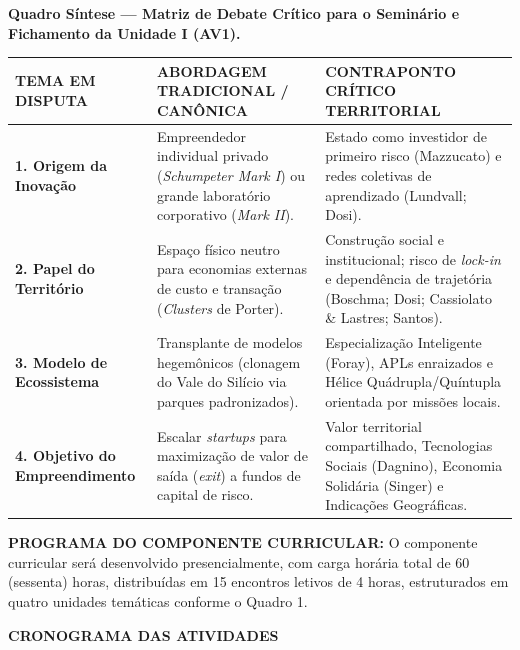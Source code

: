 \documentclass[11pt,a4paper]{article}
\begin{document}
\vspace{4pt}
\noindent\textbf{Quadro Síntese — Matriz de Debate Crítico para o Seminário e Fichamento da Unidade I (AV1).}\\[4pt]
\small
\noindent
\begin{tabularx}{\textwidth}{|p{2.9cm}|X|X|}
\hline
\rowcolor{uefslight}
\textbf{TEMA EM DISPUTA} & \textbf{ABORDAGEM TRADICIONAL / CANÔNICA} & \textbf{CONTRAPONTO CRÍTICO TERRITORIAL} \\
\hline
\textbf{1. Origem da Inovação} & Empreendedor individual privado (\textit{Schumpeter Mark I}) ou grande laboratório corporativo (\textit{Mark II}). & Estado como investidor de primeiro risco (Mazzucato) e redes coletivas de aprendizado (Lundvall; Dosi). \\
\hline
\textbf{2. Papel do Território} & Espaço físico neutro para economias externas de custo e transação (\textit{Clusters} de Porter). & Construção social e institucional; risco de \textit{lock-in} e dependência de trajetória (Boschma; Dosi; Cassiolato \& Lastres; Santos). \\
\hline
\textbf{3. Modelo de Ecossistema} & Transplante de modelos hegemônicos (clonagem do Vale do Silício via parques padronizados). & Especialização Inteligente (Foray), APLs enraizados e Hélice Quádrupla/Quíntupla orientada por missões locais. \\
\hline
\textbf{4. Objetivo do Empreendimento} & Escalar \textit{startups} para maximização de valor de saída (\textit{exit}) a fundos de capital de risco. & Valor territorial compartilhado, Tecnologias Sociais (Dagnino), Economia Solidária (Singer) e Indicações Geográficas. \\
\hline
\end{tabularx}
\normalsize

\vspace{8pt}
\noindent\textbf{PROGRAMA DO COMPONENTE CURRICULAR:} O componente curricular será desenvolvido presencialmente, com carga horária total de 60 (sessenta) horas, distribuídas em 15 encontros letivos de 4 horas, estruturados em quatro unidades temáticas conforme o Quadro 1.

\vspace{6pt}
\begin{center}
  {\bfseries CRONOGRAMA DAS ATIVIDADES}
\end{center}
\end{document}
